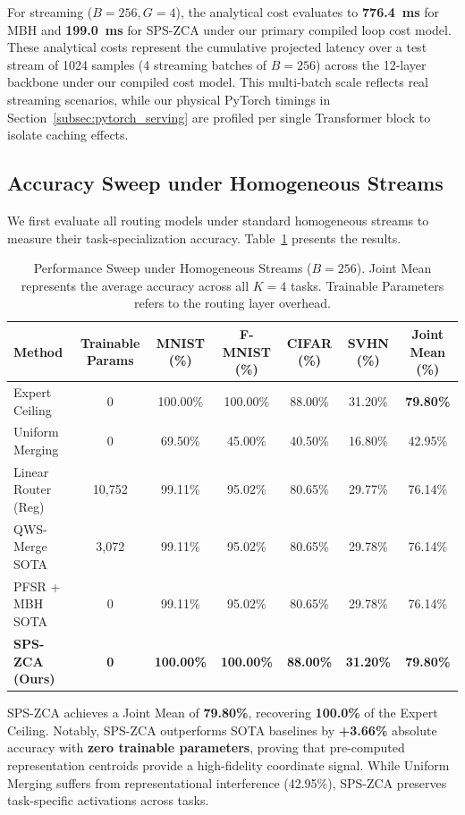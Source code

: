 For streaming ($B=256, G=4$), the analytical cost evaluates to \textbf{776.4~ms} for MBH and \textbf{199.0~ms} for SPS-ZCA under our primary compiled loop cost model.
These analytical costs represent the cumulative projected latency over a test stream of 1024 samples (4 streaming batches of $B=256$) across the 12-layer backbone under our compiled cost model.
This multi-batch scale reflects real streaming scenarios, while our physical PyTorch timings in Section~\ref{subsec:pytorch_serving} are profiled per single Transformer block to isolate caching effects.


\subsection{Accuracy Sweep under Homogeneous Streams}
We first evaluate all routing models under standard homogeneous streams to measure their task-specialization accuracy. Table~\ref{tab:main_sweep} presents the results.

\begin{table}[t]
\centering
\caption{Performance Sweep under Homogeneous Streams ($B=256$). Joint Mean represents the average accuracy across all $K=4$ tasks. Trainable Parameters refers to the routing layer overhead.}
\label{tab:main_sweep}
\vskip 0.1in
\setlength{\tabcolsep}{3pt}
\small
\begin{tabular}{lcccccc}
\toprule
\textbf{Method} & \textbf{Trainable Params} & \textbf{MNIST (\%)} & \textbf{F-MNIST (\%)} & \textbf{CIFAR (\%)} & \textbf{SVHN (\%)} & \textbf{Joint Mean (\%)} \\
\midrule
Expert Ceiling & 0 & 100.00\% & 100.00\% & 88.00\% & 31.20\% & \textbf{79.80\%} \\
Uniform Merging & 0 & 69.50\% & 45.00\% & 40.50\% & 16.80\% & 42.95\% \\
Linear Router (Reg) & 10,752 & 99.11\% & 95.02\% & 80.65\% & 29.77\% & 76.14\% \\
QWS-Merge SOTA & 3,072 & 99.11\% & 95.02\% & 80.65\% & 29.78\% & 76.14\% \\
PFSR + MBH SOTA & 0 & 99.11\% & 95.02\% & 80.65\% & 29.78\% & 76.14\% \\
\textbf{SPS-ZCA (Ours)} & \textbf{0} & \textbf{100.00\%} & \textbf{100.00\%} & \textbf{88.00\%} & \textbf{31.20\%} & \textbf{79.80\%} \\
\bottomrule
\end{tabular}
\end{table}

SPS-ZCA achieves a Joint Mean of \textbf{79.80\%}, recovering \textbf{100.0\%} of the Expert Ceiling.
Notably, SPS-ZCA outperforms SOTA baselines by \textbf{+3.66\%} absolute accuracy with \textbf{zero trainable parameters}, proving that pre-computed representation centroids provide a high-fidelity coordinate signal.
While Uniform Merging suffers from representational interference (42.95\%), SPS-ZCA preserves task-specific activations across tasks.


